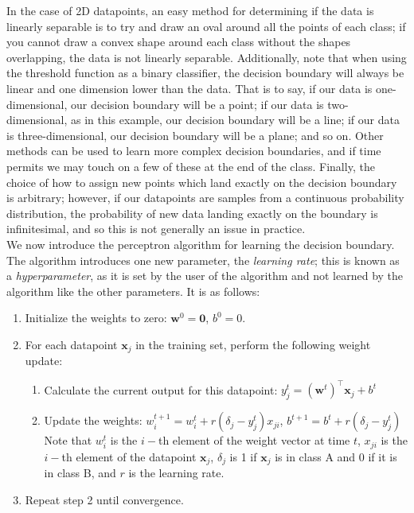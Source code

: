 \documentclass{article}
\begin{document}
\noindent In the case of 2D datapoints, an easy method for determining if the data is linearly separable is to try and draw an oval around all the points of each class; if you cannot draw a convex shape around each class without the shapes overlapping, the data is not linearly separable. Additionally, note that when using the threshold function as a binary classifier, the decision boundary will always be linear and one dimension lower than the data. That is to say, if our data is one-dimensional, our decision boundary will be a point; if our data is two-dimensional, as in this example, our decision boundary will be a line; if our data is three-dimensional, our decision boundary will be a plane; and so on. Other methods can be used to learn more complex decision boundaries, and if time permits we may touch on a few of these at the end of the class. Finally, the choice of how to assign new points which land exactly on the decision boundary is arbitrary; however, if our datapoints are samples from a continuous probability distribution, the probability of new data landing exactly on the boundary is infinitesimal, and so this is not generally an issue in practice. \\

\noindent We now introduce the perceptron algorithm for learning the decision boundary. The algorithm introduces one new parameter, the \textit{learning rate}; this is known as a \textit{hyperparameter}, as it is set by the user of the algorithm and not learned by the algorithm like the other parameters. It is as follows:
\begin{enumerate}[label=\arabic*.]
\item Initialize the weights to zero: $\mathbf{w}^0 = \mathbf{0}$, $b^0 = 0$.
\item For each datapoint $\mathbf{x}_j$ in the training set, perform the following weight update:
	  \begin{enumerate}[label=(\alph*)]
	  \item Calculate the current output for this datapoint: $y_j^t = (\mathbf{w}^t)^{\top}\mathbf{x}_j + b^t$
	  \item Update the weights: $w_i^{t+1} = w_i^t + r(\delta_j - y_j^t)x_{ji}$, $b^{t+1} = b^t + r(\delta_j - y_j^t)$ \\
	  Note that $w_i^t$ is the $i-$th element of the weight vector at time $t$, $x_{ji}$ is the $i-$th element of the datapoint $\mathbf{x}_j$, $\delta_j$ is 1 if $\mathbf{x}_j$ is in class A and 0 if it is in class B, and $r$ is the learning rate.
	  \end{enumerate}
\item Repeat step 2 until convergence.
\end{enumerate}
\end{document}
